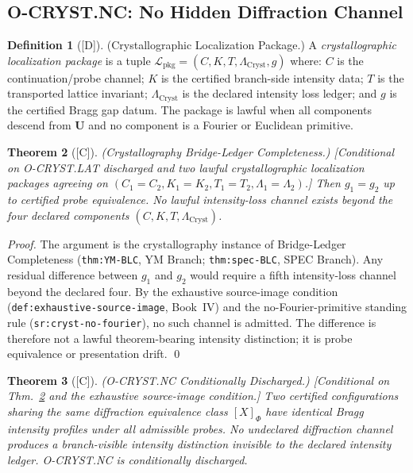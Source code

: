 \documentclass[12pt,oneside]{amsbook}
\theoremstyle{plain}
\newtheorem{theorem}{Theorem}[section]
\theoremstyle{definition}
\newtheorem{definition}[theorem]{Definition}
\theoremstyle{remark}
\newcommand{\status}[1]{\textup{[#1]}}
\begin{document}
\subsection{O-CRYST.NC: No Hidden Diffraction Channel}
\label{sec:cryst-NC-discharge}

\begin{definition}[\status{D}]\label{def:cryst-localization-package}
\textup{(Crystallographic Localization Package.)}
A \emph{crystallographic localization package} is a tuple
$\mathcal{L}_{\mathrm{pkg}} = (C, K, T, \Lambda_{\mathrm{Cryst}}, g)$
where: $C$ is the continuation/probe channel; $K$ is the certified
branch-side intensity data; $T$ is the transported lattice invariant;
$\Lambda_{\mathrm{Cryst}}$ is the declared intensity loss ledger; and
$g$ is the certified Bragg gap datum.  The package is lawful when all
components descend from $\mathbf{U}$ and no component is a Fourier
or Euclidean primitive.
\end{definition}

\begin{theorem}[\status{C}]\label{thm:cryst-BLC}
\textup{(Crystallography Bridge-Ledger Completeness.)}
\textup{[Conditional on O-CRYST.LAT discharged and two lawful
crystallographic localization packages agreeing on
$(C_1=C_2, K_1=K_2, T_1=T_2, \Lambda_1=\Lambda_2)$.]}
Then $g_1 = g_2$ up to certified probe equivalence.  No lawful
intensity-loss channel exists beyond the four declared components
$(C, K, T, \Lambda_{\mathrm{Cryst}})$.
\end{theorem}

\begin{proof}
The argument is the crystallography instance of Bridge-Ledger
Completeness (\texttt{thm:YM-BLC}, YM Branch;
\texttt{thm:spec-BLC}, SPEC Branch).  Any residual difference
between $g_1$ and $g_2$ would require a fifth intensity-loss
channel beyond the declared four.  By the exhaustive source-image
condition (\texttt{def:exhaustive-source-image}, Book~IV) and the
no-Fourier-primitive standing rule (\texttt{sr:cryst-no-fourier}),
no such channel is admitted.  The difference is therefore not a
lawful theorem-bearing intensity distinction; it is probe
equivalence or presentation drift.
\qed
\end{proof}

\begin{theorem}[\status{C}]\label{thm:cryst-NC-discharged}
\textup{(O-CRYST.NC Conditionally Discharged.)}
\textup{[Conditional on Thm.~\ref{thm:cryst-BLC} and the
exhaustive source-image condition.]}
Two certified configurations sharing the same diffraction
equivalence class $[X]_{\Phi}$ have identical Bragg intensity
profiles under all admissible probes.  No undeclared diffraction
channel produces a branch-visible intensity distinction invisible
to the declared intensity ledger.  O-CRYST.NC is conditionally
discharged.
\end{theorem}
\end{document}

